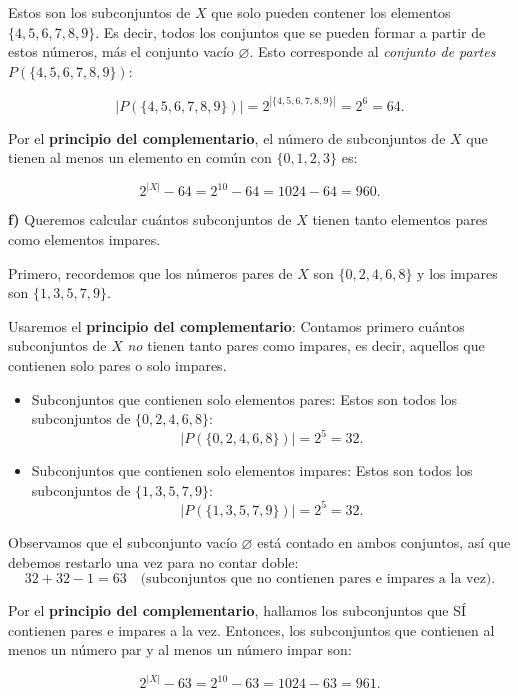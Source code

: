 \documentclass[a4paper,12pt]{article}
\begin{document}
\begin{ejercicio}[title=Ejercicio 15]
\vspace{0.5em}

Estos son los subconjuntos de $X$ que solo pueden contener los elementos $\{4,5,6,7,8,9\}$.  
Es decir, todos los conjuntos que se pueden formar a partir de estos números, más el conjunto vacío $\varnothing$.  
Esto corresponde al \emph{conjunto de partes} $P(\{4,5,6,7,8,9\})$:

\[
|P(\{4,5,6,7,8,9\})| = 2^{|\{4,5,6,7,8,9\}|} = 2^6 = 64.
\]

Por el \textbf{principio del complementario}, el número de subconjuntos de $X$ que tienen al menos un elemento en común con $\{0,1,2,3\}$ es:

\[
2^{|X|} - 64 = 2^{10} - 64 = 1024 - 64 = \boxed{960}.
\]

\textbf{f)}  
Queremos calcular cuántos subconjuntos de $X$ tienen tanto elementos pares como elementos impares.

\vspace{0.5em}

Primero, recordemos que los números pares de $X$ son $\{0,2,4,6,8\}$ y los impares son $\{1,3,5,7,9\}$.  

\end{ejercicio}
\begin{ejercicio}[title=Ejercicio 15]

Usaremos el \textbf{principio del complementario}:  
Contamos primero cuántos subconjuntos de $X$ \emph{no} tienen tanto pares como impares, es decir, aquellos que contienen solo pares o solo impares.

\begin{itemize}
\item Subconjuntos que contienen solo elementos pares:  
Estos son todos los subconjuntos de $\{0,2,4,6,8\}$:
\[
|P(\{0,2,4,6,8\})| = 2^5 = 32.
\]

\item Subconjuntos que contienen solo elementos impares:  
Estos son todos los subconjuntos de $\{1,3,5,7,9\}$:
\[
|P(\{1,3,5,7,9\})| = 2^5 = 32.
\]
\end{itemize}

Observamos que el subconjunto vacío $\varnothing$ está contado en ambos conjuntos, así que debemos restarlo una vez para no contar doble:
\[
32 + 32 - 1 = 63 \quad \text{(subconjuntos que no contienen pares e impares a la vez)}.
\]

Por el \textbf{principio del complementario}, hallamos los subconjuntos que SÍ contienen pares e impares a la vez. Entonces, los subconjuntos que contienen al menos un número par y al menos un número impar son:

\[
2^{|X|} - 63 = 2^{10} - 63 = 1024 - 63 = \boxed{961}.
\]

\end{ejercicio}
\end{document}
